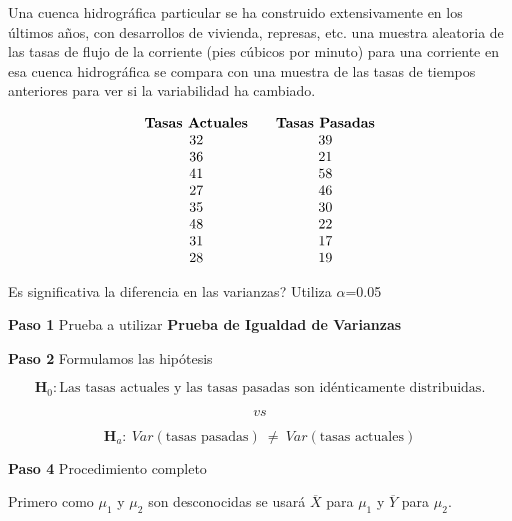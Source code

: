 \documentclass[
  a4paper,
  oneside,
  openany]{book}
\begin{document}
Una cuenca hidrográfica particular se ha construido extensivamente en los últimos años, con desarrollos de vivienda, represas, etc. una muestra aleatoria de las tasas de flujo de la corriente (pies cúbicos por minuto) para una corriente en esa cuenca hidrográfica se compara con una muestra de las tasas de tiempos anteriores para ver si la variabilidad ha cambiado.

\[
\begin{array}{c c c} 
\textbf{Tasas Actuales} &  & \textbf{Tasas Pasadas} \\
32 & & 39 \\
36 & & 21 \\
41 & & 58 \\
27 & & 46 \\
35 & & 30 \\
48 & & 22 \\
31 & & 17 \\
28 & & 19 \\
\end{array}
\]

Es significativa la diferencia en las varianzas? Utiliza \(\alpha\)=0.05

\textbf{Paso 1} Prueba a utilizar \textbf{Prueba de Igualdad de Varianzas}

\textbf{Paso 2} Formulamos las hipótesis

\[\textbf{H}_0: \mbox{Las tasas actuales y las tasas pasadas son idénticamente distribuidas.}\]

\[vs\]

\[\textbf{H}_a: \ Var(\mbox{tasas pasadas}) \ \neq  \ Var(\mbox{tasas actuales})\]

\textbf{Paso 4} Procedimiento completo

Primero como \(\mu_{1}\) y \(\mu_{2}\) son desconocidas se usará \(\overline{X}\) para \(\mu_{1}\) y \(\overline{Y}\) para \(\mu_{2}\).
\end{document}

